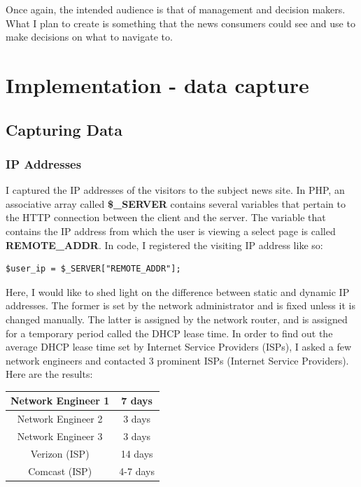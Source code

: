 \documentclass[12pt]{article}
\begin{document}
Once again, the intended audience is that of management and decision makers. What I plan to create is something that the news consumers could see and use to make decisions on what to navigate to.

\null
\vfill


\section{Implementation - data capture}
\subsection{Capturing Data}
\subsubsection{IP Addresses}
I captured the IP addresses of the visitors to the subject news site. In PHP, an associative array called \textbf{\$\_SERVER}  contains several variables that pertain to the HTTP connection between the client and the server. The variable that contains the IP address from which the user is viewing a select page is called \textbf{REMOTE\_ADDR}. In code, I registered the visiting IP address like so:
\begin{lstlisting}
$user_ip = $_SERVER["REMOTE_ADDR"];
\end{lstlisting}

Here, I would like to shed light on the difference between static and dynamic IP addresses. The former is set by the network administrator and is fixed unless it is changed manually. The latter is assigned by the network router, and is assigned for a temporary period called the DHCP lease time. In order to find out the average DHCP lease time set by Internet Service Providers (ISPs), I asked a few network engineers and contacted 3 prominent ISPs (Internet Service Providers). Here are the results:
\vspace{0.3in}

\begin{tabular}{| c | c |}
  \hline                       
  Network Engineer 1 & 7 days \\[1ex] \hline
  Network Engineer 2 & 3 days \\[1ex] \hline
  Network Engineer 3 & 3 days \\ [1ex] \hline
  Verizon (ISP) & 14 days \\[1ex] \hline
  Comcast (ISP) & 4-7 days \\[1ex]
  \hline  
\end{tabular}
\vspace{0.3in}
\end{document}
